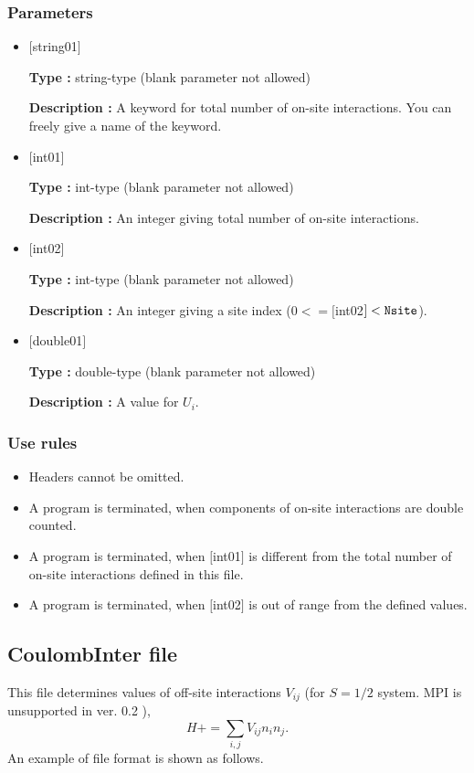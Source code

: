 \subsubsection{Parameters}
 \begin{itemize}

   \item  $[$string01$]$
   
    {\bf Type :} string-type (blank parameter not allowed)

   {\bf Description :} A keyword for total number of on-site interactions. You can freely give a name of the keyword.

   \item  $[$int01$]$
   
    {\bf Type :} int-type (blank parameter not allowed)

   {\bf Description :} An integer giving total number of on-site interactions.

  \item  $[$int02$]$
  
 {\bf Type :} int-type (blank parameter not allowed)

{\bf Description :} An integer giving a site index ($0<= [$int02$]<\verb|Nsite|$).
 
 \item  $[$double01$]$
   
   {\bf Type :} double-type (blank parameter not allowed)

  {\bf Description :}  A value for $U_i$.

\end{itemize}

\subsubsection{Use rules}
\begin{itemize}
\item Headers cannot be omitted. 
\item A program is terminated, when components of on-site interactions are double counted.
\item A program is terminated, when $[$int01$]$ is different from the total number of on-site interactions defined in this file.
\item A program is terminated, when $[$int02$]$ is out of range from the defined values.
\end{itemize}


\newpage
\subsection{CoulombInter file}
This file determines values of off-site interactions $V_{ij}$ {(for $S=1/2$ system. MPI is unsupported in ver. 0.2 )},
\begin{equation}
H+=\sum_{i,j}V_{ij} n_ {i}n_{j}.
\end{equation}
An example of file format is shown as follows.

